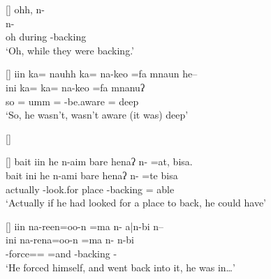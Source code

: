 \begin{exe}
[]{\glll
	ohh,  n- \\
	{}  n- \\
	oh during \n-backing \\
\glt `Oh, while they were backing.'}

[]{\glll
	 iin ka= nauhh ka= na-keo =fa mnaun he--\\
	 ini ka= {} ka= na-keo =fa mnanuʔ {}\\
	so {\iin} {\ka}= umm {\ka}= \na-be.aware ={\fa} deep{\M} {}\\
\glt `So, he wasn't, wasn't aware (it was) deep'}

\newpage
{}
[]{\begin{xlist}
\end{xlist}}

[]{\glll
	bait iin he n-aim bare henaʔ n- =at, bisa. \\
	bait ini he n-ami bare henaʔ n- =te bisa \\
	actually {\iin} {\he} \n-look.for place {\he} \n-backing ={\te} able \\
\glt `Actually if he had looked for a place to back, he could have'}

[]{\glll
	iin na-reen=oo-n =ma n- a|n-bi n-- \\
	ini na-rena=oo-n =ma n- {\a}n-bi {}\\
	{\iin} \na-force={\oo=\N} =and \n-backing \a\n-{\bi} {}\\
\glt `He forced himself, and went back into it, he was in{\ldots}'}


\end{exe}
